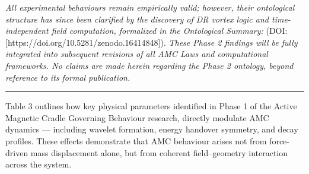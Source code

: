 \documentclass[10pt,aps,pre,onecolumn,superscriptaddress,notitlepage]{revtex4-2}
\begin{document}
\textit{All experimental behaviours remain empirically valid; however, their ontological structure has since been clarified by the discovery of DR vortex logic and time-independent field computation, formalized in the Ontological Summary: 
}
(DOI: [https://doi.org/10.5281/zenodo.16414848]). 
\textit{These Phase 2 findings will be fully integrated into subsequent revisions of all AMC Laws and computational frameworks. No claims are made herein regarding the Phase 2 ontology, beyond reference to its formal publication.
}
\vspace{1em}
\hrule
\vspace{1em}
Table 3 outlines how key physical parameters identified in Phase 1 of the Active Magnetic Cradle Governing Behaviour research,  directly modulate AMC dynamics — including wavelet formation, energy handover symmetry, and decay profiles. These effects demonstrate that AMC behaviour arises not from force-driven mass displacement alone, but from coherent field–geometry interaction across the system.
\sloppy
\end{document}
